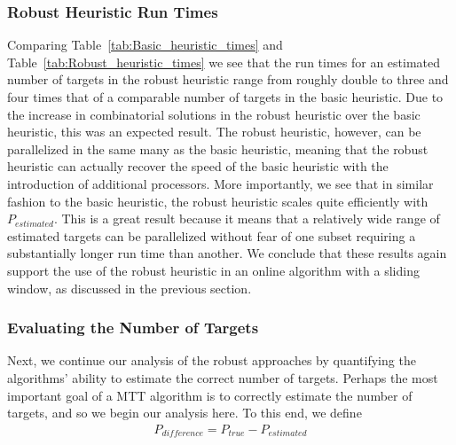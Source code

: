\documentclass[journal]{IEEEtran}
\begin{document}
\subsubsection{Robust Heuristic Run Times} Comparing Table~\ref{tab:Basic_heuristic_times} and Table~\ref{tab:Robust_heuristic_times} we see that the run times for an estimated number of targets in the robust heuristic range from roughly double to three and four times that of a comparable number of targets in the basic heuristic. Due to the increase in combinatorial solutions in the robust heuristic over the basic heuristic, this was an expected result. The robust heuristic, however, can be parallelized in the same many as the basic heuristic, meaning that the robust heuristic can actually recover the speed of the basic heuristic with the introduction of additional processors. More importantly, we see that in similar fashion to the basic heuristic, the robust heuristic scales quite efficiently with $P_{estimated}$. This is a great result because it means that a relatively wide range of estimated targets can be parallelized without fear of one subset requiring a substantially longer run time than another. We conclude that these results again support the use of the robust heuristic in an online algorithm with a sliding window, as discussed in the previous section.

\subsubsection{Evaluating the Number of Targets}
Next, we continue our analysis of the robust approaches by quantifying the algorithms' ability to estimate the correct number of targets. Perhaps the most important goal of a MTT algorithm is to correctly estimate the number of targets, and so we begin our analysis here. To this end, we define
\begin{align}
	P_{difference} = P_{true} - P_{estimated}
\end{align}
\end{document}
